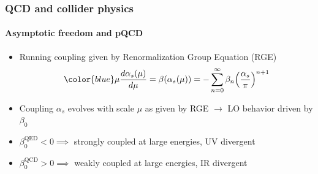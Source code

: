 \documentclass[aspectratio=43]{beamer}
\begin{document}
\begin{frame}
	
	\frametitle{QCD and collider physics}
	\framesubtitle{Asymptotic freedom and pQCD}
	
	\footnotesize
	
	\begin{itemize}
		\item Running coupling given by Renormalization Group Equation (RGE)
		\begin{equation}
		{\color{blue}\mu\frac{d\alpha_{s}(\mu)}{d\mu} = \beta(\alpha_{s}(\mu)) = -\sum_{n = 0}^{\infty} \beta_{n} \Big( \frac{\alpha_{s}}{\pi} \Big)^{n + 1}} \nonumber
		\end{equation}
		\item Coupling {\color{blue}$\alpha_{s}$} evolves with scale {\color{blue}$\mu$} as given by RGE $\rightarrow$ LO behavior driven by $\beta_{0}$
		\item $\beta_{0}^{\textrm{QED}} < 0 \implies$ strongly coupled at large energies, {\color{blue}UV divergent}
		\item $\beta_{0}^{\textrm{QCD}} > 0 \implies$ weakly coupled at large energies, {\color{red}IR divergent}
	\end{itemize}

\end{frame}
\end{document}
